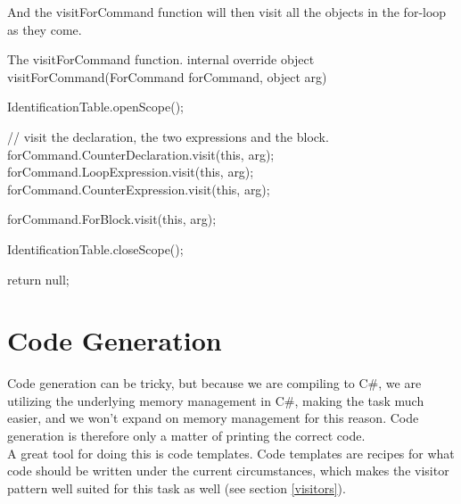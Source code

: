 And the visitForCommand function will then visit all the objects in the for-loop as they come.
\newline
\begin{source}{The visitForCommand function.}{}
internal override object visitForCommand(ForCommand forCommand, object arg)
		{
				IdentificationTable.openScope();

        // visit the declaration, the two expressions and the block.
        forCommand.CounterDeclaration.visit(this, arg);
        forCommand.LoopExpression.visit(this, arg);
        forCommand.CounterExpression.visit(this, arg);

        forCommand.ForBlock.visit(this, arg);

        IdentificationTable.closeScope();
						
        return null;
    }
\end{source}

\section{Code Generation}
Code generation can be tricky, but because we are compiling to C\#, we are utilizing the underlying memory management in C\#, making the task much easier, and we won't expand on memory management for this reason.
Code generation is therefore only a matter of printing the correct code. \\ \indent
A great tool for doing this is code templates. 
Code templates are recipes for what code should be written under the current circumstances, which makes the visitor pattern well suited for this task as well (see section \ref{visitors}).